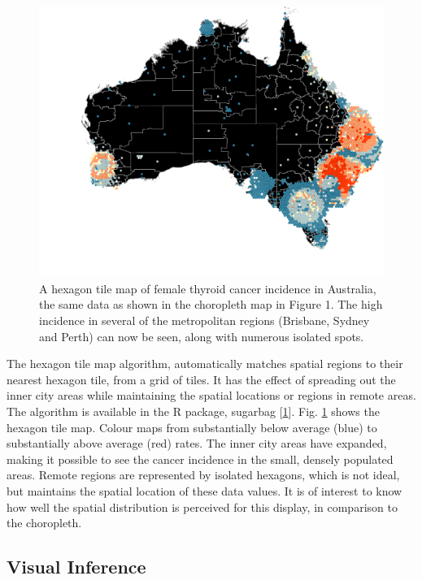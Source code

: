 \documentclass[conference,final,]{IEEEtran}
\begin{document}
\begin{figure}

{\centering \includegraphics[width=1\linewidth,height=0.3\textheight]{paper_files/figure-latex/thyroid-hex-1} 

}

\caption{A hexagon tile map of female thyroid cancer incidence in Australia, the same data as shown in the choropleth map in Figure 1. The high incidence in several of the metropolitan regions (Brisbane, Sydney and Perth) can now be seen, along with numerous isolated spots.}\label{fig:thyroid-hex}
\end{figure}

The hexagon tile map algorithm, automatically matches spatial regions to their nearest hexagon tile, from a grid of tiles. It has the effect of spreading out the inner city areas while maintaining the spatial locations or regions in remote areas. The algorithm is available in the R package, sugarbag {[}\protect\hyperlink{ref-sugarbag}{1}{]}. Fig. \ref{fig:thyroid-hex} shows the hexagon tile map. Colour maps from substantially below average (blue) to substantially above average (red) rates. The inner city areas have expanded, making it possible to see the cancer incidence in the small, densely populated areas. Remote regions are represented by isolated hexagons, which is not ideal, but maintains the spatial location of these data values. It is of interest to know how well the spatial distribution is perceived for this display, in comparison to the choropleth.

\hypertarget{visual-inference}{%
\subsection{Visual Inference}\label{visual-inference}}
\end{document}
